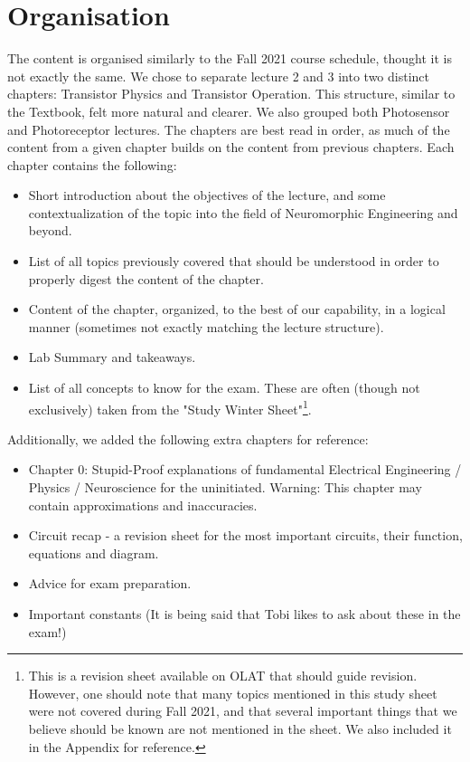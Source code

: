 \documentclass[main]{subfiles}
\begin{document}
\section*{Organisation}
The content is organised similarly to the Fall 2021 course schedule, thought it is not exactly the same. 
We chose to separate lecture 2 and 3 into two distinct chapters: Transistor Physics and Transistor Operation. This structure, similar to the Textbook, felt more natural and clearer. We also grouped both Photosensor and Photoreceptor lectures. The chapters are best read in order, as much of the content from a given chapter builds on the content from previous chapters. 
Each chapter contains the following: 
\begin{itemize}
  \item Short introduction about the objectives of the lecture, and some contextualization of the topic into the field of Neuromorphic Engineering and beyond. 
  \item List of all topics previously covered that should be understood in order to properly digest the content of the chapter.
  \item Content of the chapter, organized, to the best of our capability, in a logical manner (sometimes not exactly matching the lecture structure).
  \item Lab Summary and takeaways.
  \item List of all concepts to know for the exam. These are often (though not exclusively) taken from the "Study Winter Sheet"\footnote{This is a revision sheet available on OLAT that should guide revision. However, one should note that many topics mentioned in this study sheet were not covered during Fall 2021, and that several important things that we believe should be known are not mentioned in the sheet. We also included it in the Appendix for reference.}.
  
\end{itemize}
Additionally, we added the following extra chapters for reference: 
\begin{itemize}
    \item Chapter 0: Stupid-Proof explanations of fundamental Electrical Engineering / Physics / Neuroscience for the uninitiated. Warning: This chapter may contain approximations and inaccuracies. 
    \item Circuit recap - a revision sheet for the most important circuits, their function, equations and diagram.
    \item Advice for exam preparation.
    \item Important constants (It is being said that Tobi likes to ask about these in the exam!) 
\end{itemize}
\end{document}
